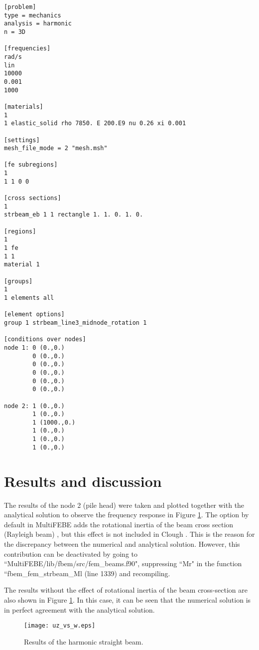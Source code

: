 \documentclass[a4]{article}
\begin{document}
\begin{Verbatim}
[problem]
type = mechanics
analysis = harmonic
n = 3D

[frequencies]
rad/s
lin
10000
0.001
1000

[materials]
1
1 elastic_solid rho 7850. E 200.E9 nu 0.26 xi 0.001

[settings]
mesh_file_mode = 2 "mesh.msh"

[fe subregions]
1
1 1 0 0

[cross sections]
1
strbeam_eb 1 1 rectangle 1. 1. 0. 1. 0.

[regions]
1
1 fe
1 1
material 1

[groups]
1
1 elements all

[element options]
group 1 strbeam_line3_midnode_rotation 1

[conditions over nodes]
node 1: 0 (0.,0.)
        0 (0.,0.)
        0 (0.,0.)
        0 (0.,0.)
        0 (0.,0.)
        0 (0.,0.)

node 2: 1 (0.,0.)
        1 (0.,0.)
        1 (1000.,0.)
        1 (0.,0.)
        1 (0.,0.)
        1 (0.,0.)
\end{Verbatim}

\section{Results and discussion}

The results of the node 2 (pile head) were taken and plotted together with the analytical solution to observe the frequency response in Figure \ref{fig:beam_results}. The option by default in MultiFEBE adds the rotational inertia of the beam cross section (Rayleigh beam) \cite{han}, but this effect is not included in Clough \cite{clough}. This is the reason for the discrepancy between the numerical and analytical solution. However, this contribution can be deactivated by going to ``MultiFEBE/lib/fbem/src/fem\_beams.f90", suppressing ``Mr" in the function ``fbem\_fem\_strbeam\_Ml (line 1339) and recompiling.

The results without the effect of rotational inertia of the beam cross-section are also shown in Figure \ref{fig:beam_results}. In this case, it can be seen that the numerical solution is in perfect agreement with the analytical solution.

\begin{figure}[h]
	\centering
	\texttt{[image: uz\_vs\_w.eps]}
	\caption{Results of the harmonic straight beam.}
	\label{fig:beam_results}
\end{figure}
\end{document}
